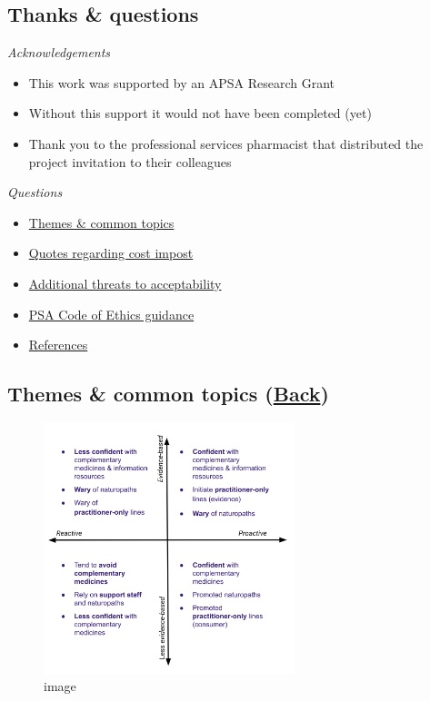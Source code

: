 \documentclass[]{article}
\providecommand{\tightlist}{%
  \setlength{\itemsep}{0pt}\setlength{\parskip}{0pt}}
\begin{document}
\subsection{Thanks \& questions}\label{thanks-questions}

\emph{Acknowledgements}

\begin{itemize}
\tightlist
\item
  This work was supported by an APSA Research Grant
\item
  Without this support it would not have been completed (yet)
\item
  Thank you to the professional services pharmacist that distributed the
  project invitation to their colleagues
\end{itemize}

\emph{Questions}

\begin{itemize}
\tightlist
\item
  \protect\hyperlink{ux2fthemes-common-topics-back}{Themes \& common
  topics}
\item
  \protect\hyperlink{ux2facceptability-cost-impost}{Quotes regarding
  cost impost}
\item
  \protect\hyperlink{ux2fadditional-threats-to-acceptability}{Additional
  threats to acceptability}
\item
  \protect\hyperlink{ux2fpsa-code-of-ethics}{PSA Code of Ethics
  guidance}
\item
  \protect\hyperlink{ux2freferences}{References}
\end{itemize}

\subsection{\texorpdfstring{Themes \& common topics
(\protect\hyperlink{ux2fthanks-questions}{Back})}{Themes \& common topics (Back)}}\label{themes-common-topics-back}

\begin{figure}
\centering
\includegraphics[width=0.65000\textwidth]{files/CMEthics_context2.png}
\caption{image}
\end{figure}
\end{document}
